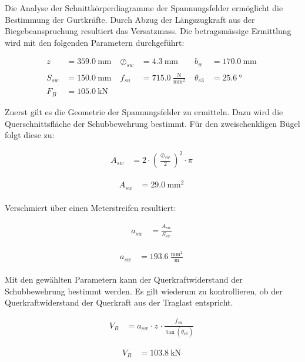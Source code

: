 \documentclass[
  11pt,
  letterpaper,
]{scrreprt}
\begin{document}
Die Analyse der Schnittkörperdiagramme der Spannungsfelder ermöglicht
die Bestimmung der Gurtkräfte. Durch Abzug der Längszugkraft aus der
Biegebeanspruchung resultiert das Versatzmass. Die betragsmässige
Ermittlung wird mit den folgenden Parametern durchgeführt:

$$
\begin{aligned}
z_{_{}} &= 359.0\ \mathrm{mm} \; 
 &\oslash_{sw_{_{}}} &= 4.3\ \mathrm{mm} \; 
 &b_{w_{_{}}} &= 170.0\ \mathrm{mm} \; 
\\[12pt]
 S_{sw_{_{}}} &= 150.0\ \mathrm{mm} \; 
 &f_{su_{_{}}} &= 715.0\ \frac{\mathrm{N}}{\mathrm{mm}^{2}} \; 
 &\theta_{c3_{_{}}} &= 25.6\ \mathrm{°} \; 
\\[12pt]
 F_{B} &= 105.0\ \mathrm{kN} \;
\end{aligned}
$$

Zuerst gilt es die Geometrie der Spannungsfelder zu ermitteln. Dazu wird
die Querschnittsfläche der Schubbewehrung bestimmt. Für den
zweischenkligen Bügel folgt diese zu:

$$
\begin{aligned}
A_{sw_{_{}}} &= 2 \cdot \left( \frac{ \oslash_{sw_{_{}}} }{ 2 } \right) ^{ 2 } \cdot \pi \; 
\end{aligned}
$$

$$
\begin{aligned}
A_{sw_{_{}}} &= 29.0\ \mathrm{mm}^{2} \;
\end{aligned}
$$

Verschmiert über einen Meterstreifen resultiert:

$$
\begin{aligned}
a_{sw_{_{}}} &= \frac{ A_{sw_{_{}}} }{ S_{sw_{_{}}} } \; 
\end{aligned}
$$

$$
\begin{aligned}
a_{sw_{_{}}} &= 193.6\ \frac{\mathrm{mm}^{2}}{\mathrm{m}} \;
\end{aligned}
$$

Mit den gewählten Parametern kann der Querkraftwiderstand der
Schubbewehrung bestimmt werden. Es gilt wiederum zu kontrollieren, ob
der Querkraftwiderstand der Querkraft aus der Traglast entspricht.

$$
\begin{aligned}
V_{R_{_{}}} &= a_{sw_{_{}}} \cdot z_{_{}} \cdot \frac{ f_{su_{_{}}} }{ \tan \left( \theta_{c3_{_{}}} \right) } \; 
\end{aligned}
$$

$$
\begin{aligned}
V_{R_{_{}}} &= 103.8\ \mathrm{kN} \;
\end{aligned}
$$
\end{document}
